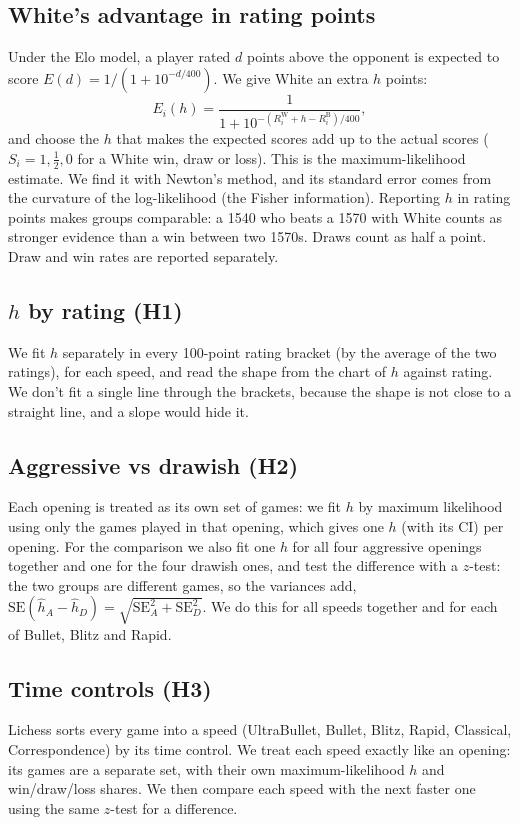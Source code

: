 \documentclass[11pt,a4paper]{article}
\begin{document}
\subsection{White's advantage in rating points}
Under the Elo model, a player rated $d$ points above the opponent is expected to score
$E(d) = 1/(1 + 10^{-d/400})$. We give White an extra $h$ points:
\[
E_i(h) = \frac{1}{1 + 10^{-(R^{\mathrm W}_i + h - R^{\mathrm B}_i)/400}},
\]
and choose the $h$ that makes the expected scores add up to the actual scores
($S_i = 1, \tfrac12, 0$ for a White win, draw or loss). This is the maximum-likelihood
estimate. We find it with Newton's method, and its standard error comes from the curvature of
the log-likelihood (the Fisher information). Reporting $h$ in rating points makes groups
comparable: a 1540 who beats a 1570 with White counts as stronger evidence than a win between two
1570s. Draws count as half a point. Draw and win rates are reported separately.

\FloatBarrier
\subsection{$h$ by rating (H1)}
We fit $h$ separately in every 100-point rating bracket (by the average of the two ratings), for
each speed, and read the shape from the chart of $h$ against rating. We don't fit a single line
through the brackets, because the shape is not close to a straight line, and a slope would hide
it.

\FloatBarrier
\subsection{Aggressive vs drawish (H2)}
Each opening is treated as its own set of games: we fit $h$ by maximum likelihood using only
the games played in that opening, which gives one $h$ (with its CI) per opening. For the
comparison we also fit one $h$ for all four aggressive openings together and one for the four
drawish ones,
and test the difference with a $z$-test: the two groups are different games, so the variances
add, $\mathrm{SE}(\hat h_A - \hat h_D) = \sqrt{\mathrm{SE}_A^2 + \mathrm{SE}_D^2}$. We do this for
all speeds together and for each of Bullet, Blitz and Rapid.

\FloatBarrier
\subsection{Time controls (H3)}
Lichess sorts every game into a speed (UltraBullet, Bullet, Blitz, Rapid, Classical,
Correspondence) by its time control. We treat each speed exactly like an opening: its games are
a separate set, with their own maximum-likelihood $h$ and win/draw/loss shares. We then compare
each speed with the next faster one using the same $z$-test for a difference.
\end{document}

